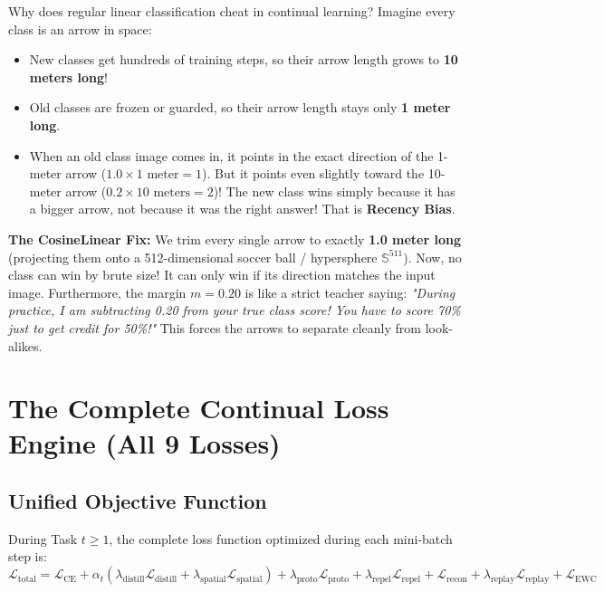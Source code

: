 \documentclass[11pt,a4paper]{article}
\begin{document}
\begin{callout}
Why does regular linear classification cheat in continual learning?\newline
Imagine every class is an arrow in space:
\begin{itemize}[noitemsep]
    \item New classes get hundreds of training steps, so their arrow length grows to \textbf{10 meters long}!
    \item Old classes are frozen or guarded, so their arrow length stays only \textbf{1 meter long}.
    \item When an old class image comes in, it points in the exact direction of the 1-meter arrow ($1.0 \times 1\text{ meter} = 1$). But it points even slightly toward the 10-meter arrow ($0.2 \times 10\text{ meters} = 2$)! The new class wins simply because it has a bigger arrow, not because it was the right answer! That is \textbf{Recency Bias}.
\end{itemize}
\textbf{The CosineLinear Fix:} We trim every single arrow to exactly \textbf{1.0 meter long} (projecting them onto a 512-dimensional soccer ball / hypersphere $\mathbb{S}^{511}$). Now, no class can win by brute size! It can only win if its direction matches the input image. Furthermore, the margin $m=0.20$ is like a strict teacher saying: \textit{"During practice, I am subtracting 0.20 from your true class score! You have to score 70\% just to get credit for 50\%!"} This forces the arrows to separate cleanly from look-alikes.
\end{callout}

\section{The Complete Continual Loss Engine (All 9 Losses)}
\label{sec:losses}

\subsection{Unified Objective Function}
During Task $t \ge 1$, the complete loss function optimized during each mini-batch step is:
\begin{equation}
\mathcal{L}_{\text{total}} = \mathcal{L}_{\text{CE}} + \alpha_t \left( \lambda_{\text{distill}} \mathcal{L}_{\text{distill}} + \lambda_{\text{spatial}} \mathcal{L}_{\text{spatial}} \right) + \lambda_{\text{proto}} \mathcal{L}_{\text{proto}} + \lambda_{\text{repel}} \mathcal{L}_{\text{repel}} + \mathcal{L}_{\text{recon}} + \lambda_{\text{replay}} \mathcal{L}_{\text{replay}} + \mathcal{L}_{\text{EWC}}
\end{equation}
\end{document}
